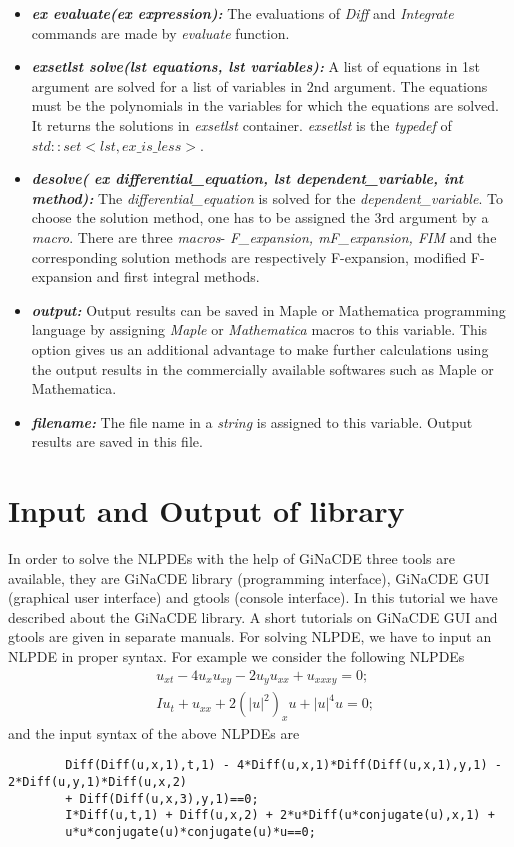 \documentclass[prd,aps,floats,showkeys,nofootinbib,notitlepage]{revtex4}
\begin{document}
\begin{itemize}
		\item[] {\em \textbf{ex evaluate(ex expression):}} The evaluations of {\em Diff} and {\em Integrate} commands are made by {\em evaluate} function.
		
		\item[] {\em \textbf{exsetlst solve(lst equations, lst variables):}} A list of equations in 1st argument are solved for a list of variables in 2nd argument. The equations must be the polynomials in the variables for which the equations are solved. It returns the solutions in {\em exsetlst} container. {\em exsetlst} is the {\em typedef} of ${ std::set< lst,ex\_is\_less>}$.  
		
		\item[] {\em \textbf{desolve( ex differential\_equation, lst dependent\_variable, int method):}} The {\em differential\_equation} is solved for the {\em dependent\_variable}. To choose the solution method, one has to be assigned the 3rd argument by a {\em macro}. There are three {\em macros}- {\em F\_expansion, mF\_expansion, FIM} and the corresponding solution methods are respectively F-expansion, modified F-expansion and first integral methods. 
		
		\item[] {\em \textbf{output:}} Output results can be saved in Maple or Mathematica programming language by assigning {\em Maple} or {\em Mathematica}
		{macros} to this variable. This option gives us an additional advantage to make further calculations using the output results in the commercially available softwares such as {Maple} or {Mathematica}.
		
		\item[] {\em \textbf{filename:}} The file name in a {\em string} is assigned to this variable. Output results are saved in this file. 
	\end{itemize}
	
	\section{Input and Output of library}
	In order to solve the NLPDEs with the help of GiNaCDE three tools are available, they are GiNaCDE library (programming interface), GiNaCDE GUI (graphical user interface) and gtools (console interface). In this tutorial we have described about the GiNaCDE library. A short tutorials on GiNaCDE GUI and gtools are given in separate manuals. For solving NLPDE, we have to input an NLPDE in proper syntax. For example we consider the following NLPDEs
	\begin{align}
		&{u_{xt}} - 4{u_x}{u_{xy}} - 2{u_y}{u_{xx}} + {u_{xxxy}} = 0;\\
		&I{u_t} + {u_{xx}} + 2{\left( {{{\left| u \right|}^2}} \right)_x}u + {\left| u \right|^4}u = 0;
	\end{align}
	and the input syntax of the above NLPDEs are
	\begin{verbatim}
		Diff(Diff(u,x,1),t,1) - 4*Diff(u,x,1)*Diff(Diff(u,x,1),y,1) - 2*Diff(u,y,1)*Diff(u,x,2)
		+ Diff(Diff(u,x,3),y,1)==0;
		I*Diff(u,t,1) + Diff(u,x,2) + 2*u*Diff(u*conjugate(u),x,1) + 
		u*u*conjugate(u)*conjugate(u)*u==0;
	\end{verbatim}   
	
\end{document}
